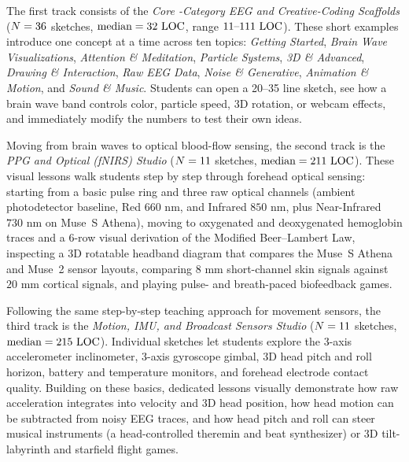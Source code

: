 \documentclass[11pt]{article}
\begin{document}
The first track consists of the \emph{Core \NBuiltinCategories-Category EEG and Creative-Coding Scaffolds} ($N = 36$ sketches, $\text{median} = 32\text{ LOC}$, range $11\text{--}111\text{ LOC}$). These short examples introduce one concept at a time across ten topics: \emph{Getting Started}, \emph{Brain Wave Visualizations}, \emph{Attention \& Meditation}, \emph{Particle Systems}, \emph{3D \& Advanced}, \emph{Drawing \& Interaction}, \emph{Raw EEG Data}, \emph{Noise \& Generative}, \emph{Animation \& Motion}, and \emph{Sound \& Music}. Students can open a 20--35 line sketch, see how a brain wave band controls color, particle speed, 3D rotation, or webcam effects, and immediately modify the numbers to test their own ideas.

Moving from brain waves to optical blood-flow sensing, the second track is the \emph{PPG and Optical (fNIRS) Studio} ($N = 11$ sketches, $\text{median} = 211\text{ LOC}$). These visual lessons walk students step by step through forehead optical sensing: starting from a basic pulse ring and three raw optical channels (ambient photodetector baseline, Red $660\text{ nm}$, and Infrared $850\text{ nm}$, plus Near-Infrared $730\text{ nm}$ on Muse~S Athena), moving to oxygenated and deoxygenated hemoglobin traces and a 6-row visual derivation of the Modified Beer--Lambert Law, inspecting a 3D rotatable headband diagram that compares the Muse~S Athena and Muse~2 sensor layouts, comparing $8\text{ mm}$ short-channel skin signals against $20\text{ mm}$ cortical signals, and playing pulse- and breath-paced biofeedback games.

Following the same step-by-step teaching approach for movement sensors, the third track is the \emph{Motion, IMU, and Broadcast Sensors Studio} ($N = 11$ sketches, $\text{median} = 215\text{ LOC}$). Individual sketches let students explore the 3-axis accelerometer inclinometer, 3-axis gyroscope gimbal, 3D head pitch and roll horizon, battery and temperature monitors, and forehead electrode contact quality. Building on these basics, dedicated lessons visually demonstrate how raw acceleration integrates into velocity and 3D head position, how head motion can be subtracted from noisy EEG traces, and how head pitch and roll can steer musical instruments (a head-controlled theremin and beat synthesizer) or 3D tilt-labyrinth and starfield flight games.
\end{document}

